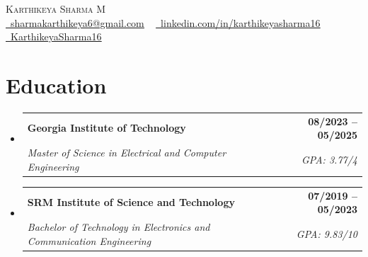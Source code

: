 \documentclass[a4paper,11pt]{article}
\makeatletter
\newcommand{\resumeSubheading}[4]{
  \vspace{-2pt}\item
    \begin{tabular*}{1.0\textwidth}[t]{l@{\extracolsep{\fill}}r}
      \textbf{#1} & \textbf{\small #2} \\
      \textit{\small#3} & \textit{\small #4} \\
    \end{tabular*}\vspace{-7pt}
}
\newcommand{\resumeSubHeadingListStart}{\begin{itemize}[leftmargin=0.0in, label={}]}
\newcommand{\resumeSubHeadingListEnd}{\end{itemize}}
\makeatother
\begin{document}
\begin{center}
    {\LARGE\scshape Karthikeya Sharma M} \\ \vspace{1pt}
    \small \href{sharmakarthikeya6@gmail.com}{\raisebox{-0.2\height}\faEnvelope\  \underline{sharmakarthikeya6@gmail.com}} ~
    \href{https://www.linkedin.com/in/karthikeyasharma16/}{\raisebox{-0.2\height}\faLinkedin\ \underline{linkedin.com/in/karthikeyasharma16}}  ~
    \href{https://github.com/KarthikeyaSharma16}{\raisebox{-0.2\height}\faGithub\ \underline{KarthikeyaSharma16}}
    \vspace{-8pt}
\end{center}

\section{Education}
  \resumeSubHeadingListStart
    \resumeSubheading
      {Georgia Institute of Technology}{08/2023 -- 05/2025}
      {Master of Science in Electrical and Computer Engineering}{GPA: 3.77/4}
      \vspace{-5pt}
      \resumeSubheading
      {SRM Institute of Science and Technology}{07/2019 -- 05/2023}
      {Bachelor of Technology in Electronics and Communication Engineering}{GPA: 9.83/10}
  \resumeSubHeadingListEnd
\vspace{-14pt}

\end{document}
